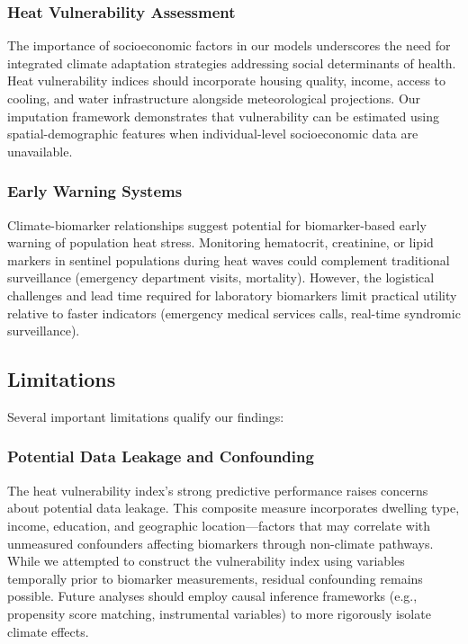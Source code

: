 \subsubsection{Heat Vulnerability Assessment}

The importance of socioeconomic factors in our models underscores the need for integrated climate adaptation strategies addressing social determinants of health. Heat vulnerability indices should incorporate housing quality, income, access to cooling, and water infrastructure alongside meteorological projections. Our imputation framework demonstrates that vulnerability can be estimated using spatial-demographic features when individual-level socioeconomic data are unavailable.

\subsubsection{Early Warning Systems}

Climate-biomarker relationships suggest potential for biomarker-based early warning of population heat stress. Monitoring hematocrit, creatinine, or lipid markers in sentinel populations during heat waves could complement traditional surveillance (emergency department visits, mortality). However, the logistical challenges and lead time required for laboratory biomarkers limit practical utility relative to faster indicators (emergency medical services calls, real-time syndromic surveillance).

\subsection{Limitations}

Several important limitations qualify our findings:

\subsubsection{Potential Data Leakage and Confounding}

The heat vulnerability index's strong predictive performance raises concerns about potential data leakage. This composite measure incorporates dwelling type, income, education, and geographic location---factors that may correlate with unmeasured confounders affecting biomarkers through non-climate pathways. While we attempted to construct the vulnerability index using variables temporally prior to biomarker measurements, residual confounding remains possible. Future analyses should employ causal inference frameworks (e.g., propensity score matching, instrumental variables) to more rigorously isolate climate effects.

